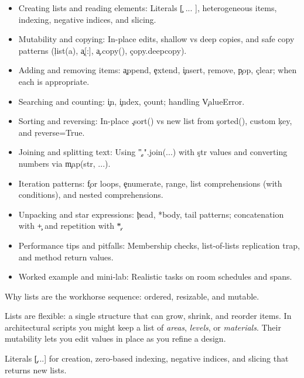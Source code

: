 \begin{tcolorbox}[%
    title=Focus of this chapter:,
    colframe=orange,
    colback = white,
    arc=2mm %
 ]
\begin{itemize}
    \item Creating lists and reading elements: Literals \c{[ ... ]}, heterogeneous items, indexing, negative indices, and slicing.
    \item Mutability and copying: In-place edits, shallow vs deep copies, and safe copy patterns (\c{list(a)}, \c{a[:]}, \c{a.copy()}, \c{copy.deepcopy}).
    \item Adding and removing items: \c{append}, \c{extend}, \c{insert}, \c{remove}, \c{pop}, \c{clear}; when each is appropriate.
    \item Searching and counting: \c{in}, \c{index}, \c{count}; handling \c{ValueError}.
    \item Sorting and reversing: In-place \c{.sort()} vs new list from \c{sorted()}, custom \c{key}, and \c{reverse=True}.
    \item Joining and splitting text: Using \c{",".join(...)} with \c{str} values and converting numbers via \c{map(str, ...)}.
    \item Iteration patterns: \c{for} loops, \c{enumerate}, \c{range}, list comprehensions (with conditions), and nested comprehensions.
    \item Unpacking and star expressions: \c{head, *body, tail} patterns; concatenation with \c{+} and repetition with \c{*}.
    \item Performance tips and pitfalls: Membership checks, list-of-lists replication trap, and method return values.
    \item Worked example and mini-lab: Realistic tasks on room schedules and spans.
\end{itemize}
\end{tcolorbox}

Why lists are the workhorse sequence: ordered, resizable, and mutable.


Lists are flexible: a single structure that can grow, shrink, and reorder items. In architectural
scripts you might keep a list of \emph{areas}, \emph{levels}, or \emph{materials}. Their mutability
lets you edit values in place as you refine a design.

Literals \c{[...]} for creation, zero-based indexing, negative indices,
and slicing that returns new lists.


